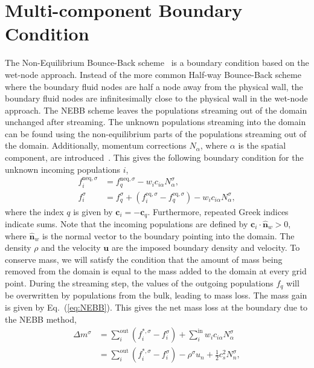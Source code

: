 \documentclass[aps,physrev,twocolumn,10pt]{revtex4-2}
\begin{document}
\section{Multi-component Boundary Condition}
The Non-Equilibrium Bounce-Back scheme~\cite{zou_pressure_1997} is a boundary condition based on the wet-node approach. Instead of the more common Half-way Bounce-Back scheme where the boundary fluid nodes are half a node away from the physical wall, the boundary fluid nodes are infinitesimally close to the physical wall in the wet-node approach. The NEBB scheme leaves the populations streaming out of the domain unchanged after streaming. The unknown populations streaming into the domain can be found using the non-equilibrium parts of the populations streaming out of the domain. Additionally, momentum corrections $N_\alpha$, where $\alpha$ is the spatial component, are introduced~\cite{kruger_lattice_2017}. This gives the following boundary condition for the unknown incoming populations $i$,
\begin{equation}\label{eq:NEBB}
\begin{split}
    f_i^{\text{neq},\sigma} &= f_q^{\text{neq},\sigma} - w_i c_{i\alpha} N_\alpha^\sigma,\\
    f_i^\sigma &= f_q^\sigma + \left(f_i^{\text{eq},\sigma} - f_q^{\text{eq},\sigma}\right) - w_i c_{i\alpha} N_\alpha^\sigma,
\end{split}
\end{equation}
where the index $q$ is given by $\bm{c}_i = -\bm{c}_q$. Furthermore, repeated Greek indices indicate sums. Note that the incoming populations are defined by $\bm{c}_i \cdot \hat{\bm{n}}_w > 0$, where $\hat{\bm{n}}_w$ is the normal vector to the boundary pointing into the domain. The density $\rho$ and the velocity $\bm{u}$ are the imposed boundary density and velocity. To conserve mass, we will satisfy the condition that the amount of mass being removed from the domain is equal to the mass added to the domain at every grid point. During the streaming step, the values of the outgoing populations $f_q$ will be overwritten by populations from the bulk, leading to mass loss. The mass gain is given by Eq.~(\ref{eq:NEBB}). This gives the net mass loss at the boundary due to the NEBB method,
\begin{equation}\label{eq:NEBB mass loss}
\begin{split}
    \Delta m^\sigma &= \sum_i^\text{out}\left(f_i^{*,\sigma} - f_i^\sigma\right) + \sum_i^\text{in} w_i c_{i\alpha}N_\alpha^\sigma\\
    &= \sum_i^{\text{out}}\left(f_i^{*,\sigma} - f_i^\sigma\right) - \rho^\sigma u_n + \frac{1}{2}c_s^2 N_{n}^\sigma,
\end{split}
\end{equation}
\end{document}

